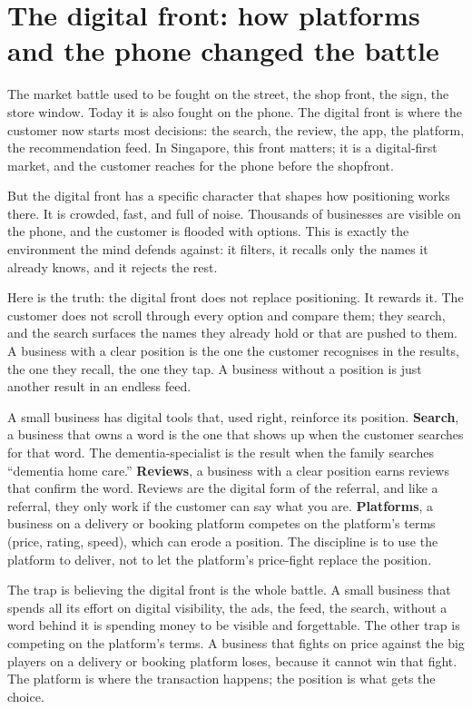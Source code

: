 \documentclass[10pt,twoside,openany]{memoir}
\newcommand{\needspacehead}{\needspace{4\baselineskip}}
\let\oldsection\section
\renewcommand{\section}{\needspacehead\oldsection}
\begin{document}
{\section{The digital front: how platforms and the phone changed the
battle}\label{the-digital-front-how-platforms-and-the-phone-changed-the-battle}

The market battle used to be fought on the street, the shop front, the
sign, the store window. Today it is also fought on the phone. The
digital front is where the customer now starts most decisions: the
search, the review, the app, the platform, the recommendation feed. In
Singapore, this front matters; it is a digital-first market, and the
customer reaches for the phone before the shopfront.

But the digital front has a specific character that shapes how
positioning works there. It is crowded, fast, and full of noise.
Thousands of businesses are visible on the phone, and the customer is
flooded with options. This is exactly the environment the mind defends
against: it filters, it recalls only the names it already knows, and it
rejects the rest.

Here is the truth: the digital front does not replace positioning. It
rewards it. The customer does not scroll through every option and
compare them; they search, and the search surfaces the names they
already hold or that are pushed to them. A business with a clear
position is the one the customer recognises in the results, the one they
recall, the one they tap. A business without a position is just another
result in an endless feed.

A small business has digital tools that, used right, reinforce its
position. \textbf{Search}, a business that owns a word is the one that
shows up when the customer searches for that word. The
dementia-specialist is the result when the family searches ``dementia
home care.'' \textbf{Reviews}, a business with a clear position earns
reviews that confirm the word. Reviews are the digital form of the
referral, and like a referral, they only work if the customer can say
what you are. \textbf{Platforms}, a business on a delivery or booking
platform competes on the platform's terms (price, rating, speed), which
can erode a position. The discipline is to use the platform to deliver,
not to let the platform's price-fight replace the position.

The trap is believing the digital front is the whole battle. A small
business that spends all its effort on digital visibility, the ads, the
feed, the search, without a word behind it is spending money to be
visible and forgettable. The other trap is competing on the platform's
terms. A business that fights on price against the big players on a
delivery or booking platform loses, because it cannot win that fight.
The platform is where the transaction happens; the position is what gets
the choice.

}
\end{document}
